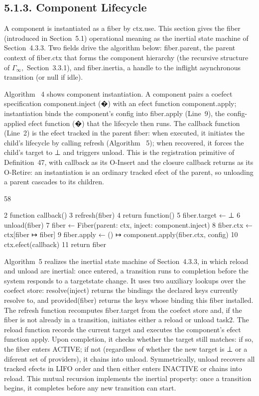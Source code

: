 \documentclass[
  10
]{article}
\begin{document}
\subsection{5.1.3. Component Lifecycle}\label{component-lifecycle}

A component is instantiated as a fiber by ctx.use. This section gives
the fiber (introduced in Section~5.1) operational meaning as the
inertial state machine of Section~4.3.3. Two fields drive the algorithm
below: fiber.parent, the parent context of fiber.ctx that forms the
component hierarchy (the recursive structure of
\(\Gamma _ { \infty } ,\) Section~3.3.1), and fiber.inertia, a handle to
the inflight asynchronous transition (or null if idle).

Algorithm~ 4 shows component instantiation. A component pairs a coefect
specification component.inject (�) with an efect function
component.apply; instantiation binds the component's config into
fiber.apply (Line~9), the config-applied efect function (�) that the
lifecycle then runs. The callback function (Line~2) is the efect tracked
in the parent fiber: when executed, it initiates the child's lifecycle
by calling refresh (Algorithm~ 5); when recovered, it forces the child's
target to ⊥ and triggers unload. This is the registration primitive of
Definition~47, with callback as its O-Insert and the closure callback
returns as its O-Retire: an instantiation is an ordinary tracked efect
of the parent, so unloading a parent cascades to its children.

58

2 function callback() 3 refresh(fiber) 4 return function() 5
fiber.target ← ⊥ 6 unload(fiber) 7 fiber ← Fiber(parent: ctx, inject:
component.inject) 8 fiber.ctx ← ctx{[}fiber ↦ fiber{]} 9 fiber.apply ←
() ↦ component.apply(fiber.ctx, config) 10 ctx.efect(callback) 11 return
fiber

Algorithm~5 realizes the inertial state machine of Section~4.3.3, in
which reload and unload are inertial: once entered, a transition runs to
completion before the system responds to a targetstate change. It uses
two auxiliary lookups over the coefect store: resolve(inject) returns
the bindings the declared keys currently resolve to, and provided(fiber)
returns the keys whose binding this fiber installed. The refresh
function recomputes fiber.target from the coefect store and, if the
fiber is not already in a transition, initiates either a reload or
unload task2. The reload function records the current target and
executes the component's efect function apply. Upon completion, it
checks whether the target still matches: if so, the fiber enters ACTIVE;
if not (regardless of whether the new target is ⊥ or a diferent set of
providers), it chains into unload. Symmetrically, unload recovers all
tracked efects in LIFO order and then either enters INACTIVE or chains
into reload. This mutual recursion implements the inertial property:
once a transition begins, it completes before any new transition can
start.
\end{document}
